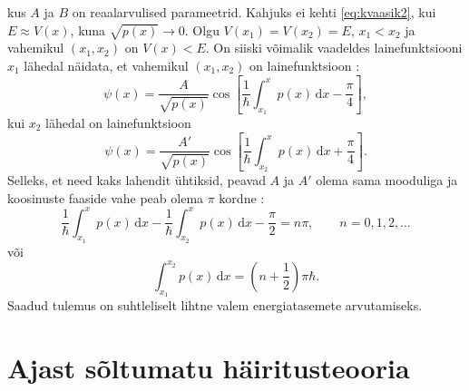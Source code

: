\documentclass{trkut}%
\begin{document}
kus $A$ ja $B$ on reaalarvulised parameetrid.
Kahjuks ei kehti \eqref{eq:kvaasik2}, kui $E \approx V(x)$, kuna $\sqrt{p(x)} \to 0$. Olgu $V(x_1)=V(x_2)=E$, $x_1<x_2$ ja vahemikul $(x_1, x_2)$ on $V(x)<E$.
On siiski võimalik vaadeldes lainefunktsiooni $x_1$ lähedal näidata, et vahemikul $(x_1, x_2)$ on lainefunktsioon \parencite[167-170]{landau05}:
\begin{equation}
    \psi(x)=\frac{A}{\sqrt{p(x)}} \cos \left[ \frac{1}{\hbar}\int_{x_1}^{x} p(x)\, \mathrm{d}x - \frac{\pi}{4} \right],
\end{equation}
kui $x_2$ lähedal on lainefunktsioon
\begin{equation}
    \psi(x)=\frac{A'}{\sqrt{p(x)}} \cos \left[ \frac{1}{\hbar}\int_{x_2}^{x} p(x)\, \mathrm{d}x + \frac{\pi}{4} \right].
\end{equation}
Selleks, et need kaks lahendit ühtiksid, peavad $A$ ja $A'$ olema sama mooduliga ja koosinuste faaside vahe peab olema $\pi$ kordne \parencite[446]{shankar94}:
\begin{equation}
    \frac{1}{\hbar}\int_{x_1}^{x} p(x)\, \mathrm{d}x - \frac{1}{\hbar}\int_{x_2}^{x} p(x)\, \mathrm{d}x - \frac{\pi}{2} = n\pi, \qquad n=0, 1, 2, \dots
\end{equation}
või
\begin{equation}
    \int_{x_1}^{x_2} p(x)\, \mathrm{d}x =\left(n+\frac{1}{2}\right)\pi \hbar.
\end{equation}
Saadud tulemus on suhtleliselt lihtne valem energiatasemete arvutamiseks.



\section{Ajast sõltumatu häiritusteooria}
\end{document}
